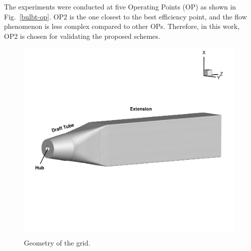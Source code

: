The experiments were conducted at five Operating Points (OP) as shown in Fig.~\ref{bulbt-op}. OP2 is the one closest to the best efficiency point, and the flow phenomenon is less complex compared to other OPs. Therefore, in this work, OP2 is chosen for validating the proposed schemes.
\begin{figure}[t]  
\centering
     \includegraphics[clip=true, trim= 1.75cm 6.5cm 1.75cm 0.0cm,width=0.99\linewidth]{./figures/bulbt/geometry}                            
     \caption{Geometry of the grid.}
     \label{grid}
\end{figure}

